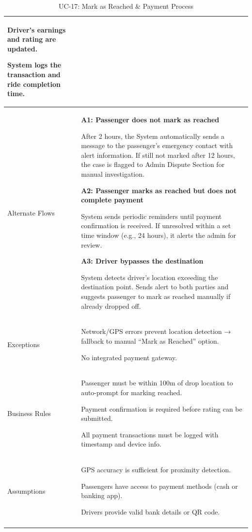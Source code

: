 \begin{longtable}{|p{3.5cm}|p{12cm}|}
Driver’s earnings and rating are updated.

System logs the transaction and ride completion time. \\
\hline
Alternate Flows &
\textbf{A1: Passenger does not mark as reached}

After 2 hours, the System automatically sends a message to the passenger’s emergency contact with alert information. If still not marked after 12 hours, the case is flagged to Admin Dispute Section for manual investigation.

\textbf{A2: Passenger marks as reached but does not complete payment}

System sends periodic reminders until payment confirmation is received. If unresolved within a set time window (e.g., 24 hours), it alerts the admin for review.

\textbf{A3: Driver bypasses the destination}

System detects driver’s location exceeding the destination point. Sends alert to both parties and suggests passenger to mark as reached manually if already dropped off. \\
\hline
Exceptions &
Network/GPS errors prevent location detection → fallback to manual “Mark as Reached” option.

No integrated payment gateway. \\
\hline
Business Rules &
Passenger must be within 100m of drop location to auto-prompt for marking reached.

Payment confirmation is required before rating can be submitted.

All payment transactions must be logged with timestamp and device info. \\
\hline
Assumptions &
GPS accuracy is sufficient for proximity detection.

Passengers have access to payment methods (cash or banking app).

Drivers provide valid bank details or QR code. \\
\hline
\caption{UC-17: Mark as Reached \& Payment Process}
\end{longtable}

